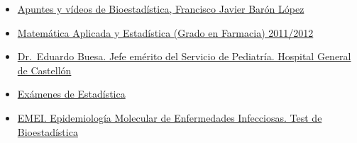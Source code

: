 \documentclass[
]{book}
\begin{document}
\begin{itemize}
\item
  \href{https://www.bioestadistica.uma.es/baron/apuntes/}{Apuntes y vídeos de Bioestadística, Francisco Javier Barón López}
\item
  \href{https://personal.us.es/pmr/index.php/docencia/cursos-anteriores/88-2011-2012/94-matematica-aplicada-y-estadistica-grado-en-farmacia-2011-2012}{Matemática Aplicada y Estadística (Grado en Farmacia) 2011/2012}
\item
  \href{http://eduardobuesa.es}{Dr.~Eduardo Buesa. Jefe emérito del Servicio de Pediatría. Hospital General de Castellón}
\item
  \href{https://aprendeconalf.es/docencia/estadistica/examenes/}{Exámenes de Estadística}
\item
  \href{https://epidemiologiamolecular.com/investigacion-epidemiologica/test-de-bioestadistica/}{EMEI. Epidemiología Molecular de Enfermedades Infecciosas. Test de Bioestadística}
\end{itemize}

  
\end{document}
